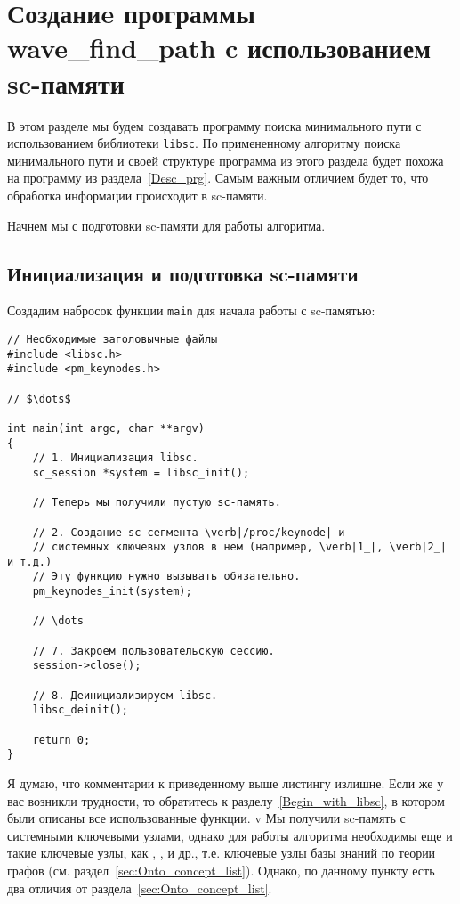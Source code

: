 \section{Созданиe программы wave\_find\_path c использованием sc-памяти}
\label{sec:Desc_libscprg}

В этом разделе мы будем создавать программу поиска минимального пути с
использованием библиотеки \verb|libsc|. По примененному алгоритму
поиска минимального пути и своей структуре программа из этого раздела
будет похожа на программу из раздела~\ref{Desc_prg}. Самым важным
отличием будет то, что обработка информации происходит в sc-памяти.

Начнем мы с подготовки sc-памяти для работы алгоритма.

\subsection{Инициализация и подготовка sc-памяти}
\label{sec:libscprg_init_sc_memory}

Создадим набросок функции \lstinline|main| для начала работы с
sc-памятью:
\begin{lstlisting}[texcl]
// Необходимые заголовычные файлы
#include <libsc.h>
#include <pm_keynodes.h>

// $\dots$

int main(int argc, char **argv)
{
    // 1. Инициализация libsc.
    sc_session *system = libsc_init();

    // Теперь мы получили пустую sc-память.

    // 2. Создание sc-сегмента \verb|/proc/keynode| и
    // системных ключевых узлов в нем (например, \verb|1_|, \verb|2_| и т.д.)
    // Эту функцию нужно вызывать обязательно.
    pm_keynodes_init(system);

    // \dots

    // 7. Закроем пользовательскую сессию.
    session->close();

    // 8. Деинициализируем libsc.
    libsc_deinit();

    return 0;
}
\end{lstlisting}

Я думаю, что комментарии к приведенному выше листингу излишне. Если же
у вас возникли трудности, то обратитесь к
разделу~\ref{Begin_with_libsc}, в котором были описаны все
использованные функции.
v
Мы получили sc-память с системными ключевыми узлами, однако для работы
алгоритма необходимы еще и такие ключевые узлы, как
, ,  и др.,
т.е. ключевые узлы базы знаний по теории графов
(см. раздел~\ref{sec:Onto_concept_list}). Однако, по данному
пункту есть два отличия от раздела~\ref{sec:Onto_concept_list}.

